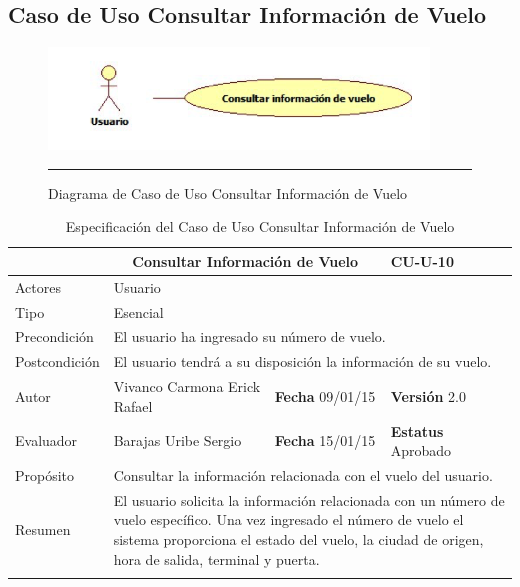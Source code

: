 \subsection{Caso de Uso Consultar Información de Vuelo}

\begin{figure}[htbp]
	\centering
		\includegraphics[width=0.9\textwidth]{Figuras/cuConsultarInformacionVuelo.png}
		\rule{30em}{0.5pt}
	\caption[Diagrama de Caso de Uso Consultar Información de Vuelo]{Diagrama de Caso de Uso Consultar Información de Vuelo}
	\label{fig:cuConsultarInformacionVuelo}
\end{figure}

\begin{longtable}{|p{2.5cm}|p{6.4cm}|p{2cm}|p{2cm}|}
	\hline
		\rowcolor[RGB]{51,153,255}{Caso de Uso}&\multicolumn{2}{c}{Consultar Información de Vuelo}&{\textbf{CU-U-10}}\\
	\hline
		{Actores}&\multicolumn{3}{p{11.2cm}|}{Usuario}\\
	\hline
		{Tipo}&\multicolumn{3}{p{11.2cm}|}{Esencial}\\
	\hline
		{Precondición}&\multicolumn{3}{p{11.2cm}|}{El usuario ha ingresado su número de vuelo.}\\
	\hline
		{Postcondición}&\multicolumn{3}{p{11.2cm}|}{El usuario tendrá a su disposición la información de su vuelo.}\\
	\hline
		{Autor}&{Vivanco Carmona Erick Rafael}&{\textbf{Fecha} 09/01/15}&{\textbf{Versión} 2.0}\\
			\hline
		{Evaluador}&{Barajas Uribe Sergio}&{\textbf{Fecha} 15/01/15}&{\textbf{Estatus} Aprobado}\\
	\hline
		{Propósito}&\multicolumn{3}{p{11.2cm}|}{Consultar la información relacionada con el vuelo del usuario.}\\
	\hline
		{Resumen}&\multicolumn{3}{p{11.2cm}|}{El usuario solicita la información relacionada con un número de vuelo específico. Una vez ingresado el número de vuelo el sistema proporciona el estado del vuelo, la ciudad de origen, hora de salida, terminal y puerta.}\\	
	\hline
	\caption[Especificación del Caso de Uso Consultar Información de Vuelo]{Especificación del Caso de Uso Consultar Información de Vuelo}
    	\label{tab:cuConsultarInformacionVuelo}
\end{longtable}

